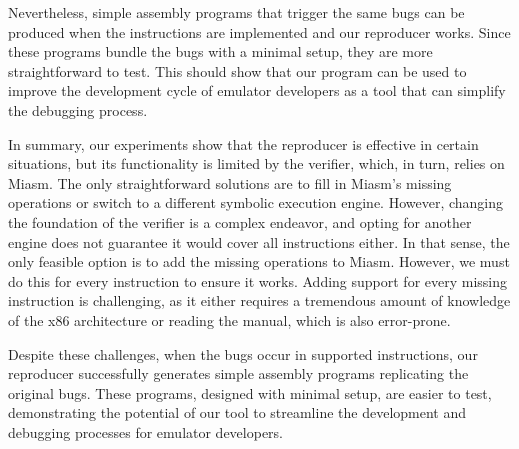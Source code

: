 Nevertheless, simple assembly programs that trigger the same bugs can be produced when the instructions are implemented and our reproducer works.
Since these programs bundle the bugs with a minimal setup, they are more straightforward to test.
This should show that our program can be used to improve the development cycle of emulator developers as a tool that can simplify the debugging process.


In summary, our experiments show that the reproducer is effective in certain situations, but its functionality is limited by the verifier, which, in turn, relies on Miasm.
The only straightforward solutions are to fill in Miasm's missing operations or switch to a different symbolic execution engine.
However, changing the foundation of the verifier is a complex endeavor, and opting for another engine does not guarantee it would cover all instructions either.
In that sense, the only feasible option is to add the missing operations to Miasm.
However, we must do this for every instruction to ensure it works.
Adding support for every missing instruction is challenging, as it either requires a tremendous amount of knowledge of the x86 architecture or reading the manual, which is also error-prone. 

Despite these challenges, when the bugs occur in supported instructions, our reproducer successfully generates simple assembly programs replicating the original bugs.
These programs, designed with minimal setup, are easier to test, demonstrating the potential of our tool to streamline the development and debugging processes for emulator developers.
